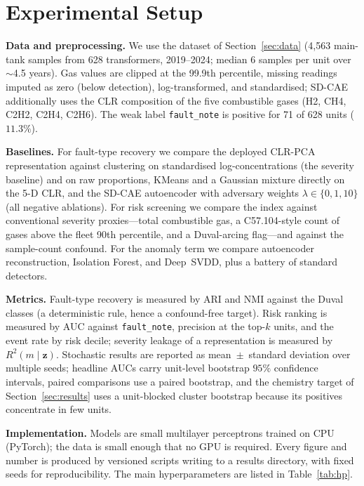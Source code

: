 \section{Experimental Setup}
\label{sec:exp}

\textbf{Data and preprocessing.} We use the dataset of Section~\ref{sec:data} (4{,}563 main-tank samples
from 628 transformers, 2019--2024; median 6 samples per unit over $\sim$4.5 years). Gas values
are clipped at the 99.9th percentile, missing readings imputed as zero (below detection),
log-transformed, and standardised; SD-CAE additionally uses the CLR composition of the five
combustible gases (H2, CH4, C2H2, C2H4, C2H6). The weak label \texttt{fault\_note} is positive for 71 of 628 units
($11.3\%$).

\textbf{Baselines.} For fault-type recovery we compare the deployed CLR-PCA representation
against clustering on standardised log-concentrations (the severity baseline) and on raw
proportions, KMeans and a Gaussian mixture directly on the 5-D CLR, and the SD-CAE autoencoder
with adversary weights $\lambda\in\{0,1,10\}$ (all negative ablations). For risk screening we compare the
index against conventional severity proxies---total combustible gas, a C57.104-style count of
gases above the fleet 90th percentile, and a Duval-arcing flag---and against the sample-count
confound. For the anomaly term we compare autoencoder reconstruction, Isolation Forest, and
Deep~SVDD, plus a battery of standard detectors.

\textbf{Metrics.} Fault-type recovery is measured by ARI and NMI against the Duval classes (a
deterministic rule, hence a confound-free target). Risk ranking is measured by AUC against
\texttt{fault\_note}, precision at the top-$k$ units, and the event rate by risk decile;
severity leakage of a representation is measured by $R^2(m\mid\mathbf{z})$. Stochastic results
are reported as mean~$\pm$~standard deviation over multiple seeds; headline AUCs carry
unit-level bootstrap $95\%$ confidence intervals, paired comparisons use a paired bootstrap,
and the chemistry target of Section~\ref{sec:results} uses a unit-blocked cluster bootstrap
because its positives concentrate in few units.

\textbf{Implementation.} Models are small multilayer perceptrons trained on CPU (PyTorch); the
data is small enough that no GPU is required. Every figure and number is produced by versioned
scripts writing to a results directory, with fixed seeds for reproducibility. The main
hyperparameters are listed in Table~\ref{tab:hp}.

